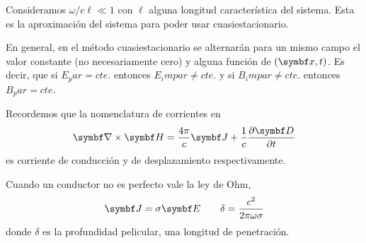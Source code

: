 \documentclass[10pt,oneside]{CBFT_book}
\begin{document}
Consideramos $\omega/c \ell \ll 1$ con $\ell$ alguna longitud característica del sistema.
Esta es la aproximación del sistema para poder usar cuasiestacionario.

En general, en el método cuasiestacionario se alternarán para un mismo campo el valor constante
(no necesariamente cero) y alguna función de $(\vb{x}, t)$. Es decir, que si $E_par = cte.$
entonces $E_impar \neq cte.$ y si $B_impar \neq cte.$ entonces $B_par = cte.$

Recordemos que la nomenclatura de corrientes en 
\[
	\rotorm{H} = \frac{4\pi}{c}\vb{J} + \frac{1}{c}\dpar{\vb{D}}{t}
\]
es corriente de conducción y de desplazamiento respectivamente.

Cuando un conductor no es perfecto vale la ley de Ohm,
\[
	\vb{J} = \sigma \vb{E} \qquad  \delta = \frac{c^2}{2\pi\omega\sigma}
\]
donde $\delta$ es la profundidad pelicular, una longitud de penetración.



\end{document}
